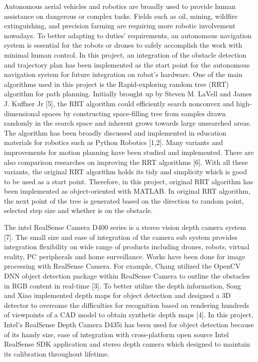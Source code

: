 \documentclass[
  oneside]{ubcthesis}
\begin{document}
Autonomous aerial vehicles and robotics are broadly used to provide human assistance on dangerous or complex tasks. Fields such as oil, mining, wildfire extinguishing, and precision farming are requiring more robotic involvement nowadays. To better adapting to duties' requirements, an autonomous navigation system is essential for the robots or drones to safely accomplish the work with minimal human control. In this project, an integration of the obstacle detection and trajectory plan has been implemented as the start point for the autonomous navigation system for future integration on robot's hardware.
One of the main algorithms used in this project is the Rapid-exploring random tree (RRT) algorithm for path planning. Initially brought up by Steven M. LaVell and James J. Kuffner Jr {[}5{]}, the RRT algorithm could efficiently search nonconvex and high-dimensional spaces by constructing space-filling tree from samples drawn randomly in the search space and inherent grows towards large unsearched areas. The algorithm has been broadly discussed and implemented in education materials for robotics such as Python Robotics {[}1,2{]}. Many variants and improvements for motion planning have been studied and implemented. There are also comparison researches on improving the RRT algorithms {[}6{]}. With all these variants, the original RRT algorithm holds its tidy and simplicity which is good to be used as a start point. Therefore, in this project, original RRT algorithm has been implemented as object-oriented with MATLAB. In original RRT algorithm, the next point of the tree is generated based on the direction to random point, selected step size and whether is on the obstacle.

The intel RealSense Camera D400 series is a stereo vision depth camera system {[}7{]}. The small size and ease of integration of the camera sub system provides integration flexibility on wide range of products including drones, robots, virtual reality, PC peripherals and home surveillance. Works have been done for image processing with RealSense Camera. For example, Chang utilized the OpenCV DNN object detection package within RealSense Camera to outline the obstacles in RGB content in real-time {[}3{]}. To better utilize the depth information, Song and Xiao implemented depth maps for object detection and designed a 3D detector to overcome the difficulties for recognition based on rendering hundreds of viewpoints of a CAD model to obtain synthetic depth maps {[}4{]}. In this project, Intel's RealSense Depth Camera D435i has been used for object detection because of its handy size, ease of integration with cross-platform open source Intel RealSense SDK application and stereo depth camera which designed to maintain its calibration throughout lifetime.
\end{document}
